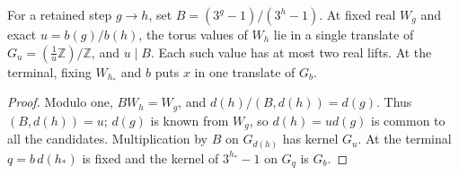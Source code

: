 \begin{lemma}\label{lem:trace-fibres}
For a retained step $g\to h$, set $B=(3^g-1)/(3^h-1)$.
At fixed real $W_g$ and exact $u=b(g)/b(h)$, the torus values of
$W_h$ lie in a single translate of $G_u=(\tfrac1u\mathbb Z)/\mathbb Z$,
and $u\mid B$. Each such value has at most two real lifts.
At the terminal, fixing $W_{h_*}$ and $b$ puts $x$ in one translate
of $G_b$.
\end{lemma}
\begin{proof}
Modulo one, $B W_h=W_g$, and $d(h)/(B,d(h))=d(g)$. Thus
$(B,d(h))=u$; $d(g)$ is known from $W_g$, so $d(h)=ud(g)$ is
common to all the candidates. Multiplication by $B$ on $G_{d(h)}$
has kernel $G_u$. At the terminal $q=b\,d(h_*)$ is fixed and the
kernel of $3^{h_*}-1$ on $G_q$ is $G_b$.
\end{proof}

